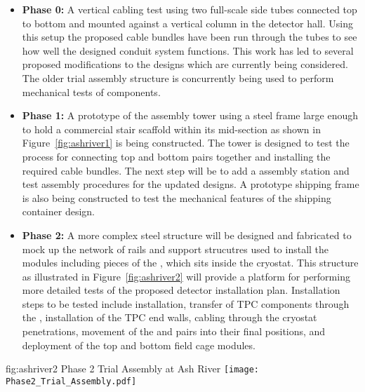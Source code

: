 \begin{itemize}
  \item {\bf Phase 0:} A vertical cabling test using two full-scale 
          side tubes connected top to bottom and mounted 
         against a vertical column in the detector hall.  Using this 
         setup the proposed cable bundles have been run through the 
         tubes to see how well the designed conduit system functions.
         This work has led to several proposed modifications to the 
         designs which are currently being considered.  The older 
          trial assembly structure is concurrently 
         being used to perform mechanical tests of  
         components. 
  \item {\bf Phase 1:} A prototype of the   
         assembly tower using a steel frame large enough to hold a 
         commercial stair scaffold within its mid-section as shown 
         in Figure~\ref{fig:ashriver1} is being constructed.  The 
         tower is designed to test the process for connecting top 
         and bottom  pairs together and installing the 
         required cable bundles.  The next step will be to add a
          assembly station and test assembly procedures 
         for the updated  designs.  A prototype 
          shipping frame is also being constructed to 
         test the mechanical features of the shipping container 
         design.  
  \item {\bf Phase 2:} A more complex steel structure will be 
         designed and fabricated to mock up the network of rails 
         and support strucutres used to install the 
          modules including pieces of the , 
         which sits inside the cryostat.  This structure as 
         illustrated in Figure~\ref{fig:ashriver2} will provide 
         a platform for performing more detailed tests of the 
         proposed detector installation plan.  Installation steps 
         to be tested include  installation, transfer 
         of TPC components through the , installation
         of the TPC end walls, cabling through the cryostat 
         penetrations, movement of the  and 
          pairs into their final positions, and 
         deployment of the top and bottom field cage modules.
\end{itemize}
\begin{dunefigure}{fig:ashriver2}
  {Phase 2 Trial Assembly at Ash River}
  \texttt{[image: Phase2\_Trial\_Assembly.pdf]}
\end{dunefigure}

